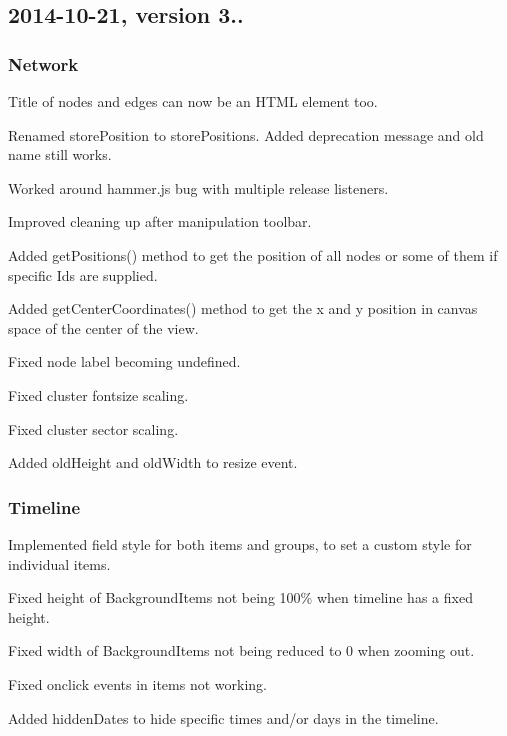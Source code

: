 \subsection*{2014-\/10-\/21, version 3..}

\subsubsection*{Network}


\begin{DoxyItemize}
\item Title of nodes and edges can now be an H\+T\+ML element too.
\item Renamed store\+Position to store\+Positions. Added deprecation message and old name still works.
\item Worked around hammer.\+js bug with multiple release listeners.
\item Improved cleaning up after manipulation toolbar.
\item Added get\+Positions() method to get the position of all nodes or some of them if specific Ids are supplied.
\item Added get\+Center\+Coordinates() method to get the x and y position in canvas space of the center of the view.
\item Fixed node label becoming undefined.
\item Fixed cluster fontsize scaling.
\item Fixed cluster sector scaling.
\item Added old\+Height and old\+Width to resize event.
\end{DoxyItemize}

\subsubsection*{Timeline}


\begin{DoxyItemize}
\item Implemented field {\ttfamily style} for both items and groups, to set a custom style for individual items.
\item Fixed height of Background\+Items not being 100\% when timeline has a fixed height.
\item Fixed width of Background\+Items not being reduced to 0 when zooming out.
\item Fixed onclick events in items not working.
\item Added hidden\+Dates to hide specific times and/or days in the timeline.
\end{DoxyItemize}

